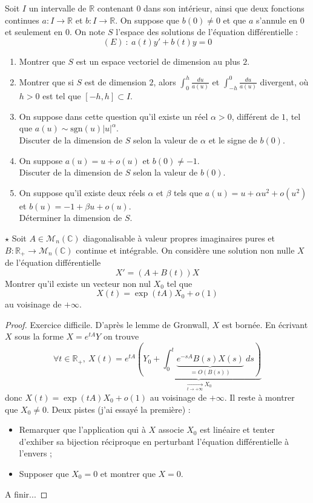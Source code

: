 \documentclass[french,a4paper]{article}
\newcommand{\R}{\mathbb{R}}
\newcommand{\C}{\mathbb{C}}
\theoremstyle{plain}
\theoremstyle{definition}
\theoremstyle{remark}
\begin{document}
\begin{ex}[Moulin.ED.33]{}
	Soit $I$ un intervalle de $\R$ contenant $0$ dans son intérieur, ainsi que deux fonctions continues $a:I\to\R$ et $b:I\to\R$. On suppose que $b(0)\ne0$ et que $a$ s'annule en $0$ et seulement en $0$. On note $S$ l'espace des solutions de l'équation différentielle : $$(E)\ : \ a(t)y'+b(t)y=0$$
	\begin{enumerate}
		\item Montrer que $S$ est un espace vectoriel de dimension au plus $2$.
		\item Montrer que si $S$ est de dimension $2$, alors $\displaystyle\int_{0}^{h}\frac{du}{a(u)}$ et $\displaystyle\int_{-h}^{0}\frac{du}{a(u)}$ divergent, où $h>0$ est tel que $[-h,h]\subset I$.
		\item On suppose dans cette question qu'il existe un réel $\alpha>0$, différent de $1$, tel que $a(u)\sim\text{sgn}(u)\lvert u\rvert^\alpha$. \\
		Discuter de la dimension de $S$ selon la valeur de $\alpha$ et le signe de $b(0)$.
		\item On suppose $a(u)=u+o(u)$ et $b(0)\ne -1$. \\
		Discuter de la dimension de $S$ selon la valeur de $b(0)$.
		\item On suppose qu'il existe deux réels $\alpha$ et $\beta$ tels que $a(u)=u+\alpha u^2+o(u^2)$ et $b(u)=-1+\beta u+o(u)$. \\ Déterminer la dimension de $S$.
	\end{enumerate}
\end{ex}

\begin{ex}[Moulin.ED.34]{$\star$}
	Soit $A\in\mathcal{M}_n(\C)$ diagonalisable à valeur propres imaginaires pures et $B:\R_+\to\mathcal{M}_n(\C)$ continue et intégrable. On considère une solution non nulle $X$ de l'équation différentielle $$X'=(A+B(t))X$$ Montrer qu'il existe un vecteur non nul $X_0$ tel que $$X(t)=\exp(tA)X_0+o(1)$$ au voisinage de $+\infty$.
\end{ex}
\begin{proof}
	Exercice difficile. D'après le lemme de Gronwall, $X$ est bornée. En écrivant $X$ sous la forme $X=e^{tA}Y$ on trouve $$\forall t\in\R_+,\ X(t)=e^{tA}\underbrace{\left(Y_0+\int_{0}^{t}\underbrace{e^{-sA}B(s)X(s)}_{=O(B(s))}\ ds\right)}_{\xrightarrow[t\to+\infty]{}X_0}$$ donc $X(t)=\exp(tA)X_0+o(1)$ au voisinage de $+\infty$. Il reste à montrer que $X_0\ne 0$. Deux pistes (j'ai essayé la première) : 
	\begin{itemize}
		\item Remarquer que l'application qui à $X$ associe $X_0$ est linéaire et tenter d'exhiber sa bijection réciproque en perturbant l'équation différentielle à l'envers ;
		\item Supposer que $X_0=0$ et montrer que $X=0$.
	\end{itemize} A finir...
\end{proof}
\end{document}
